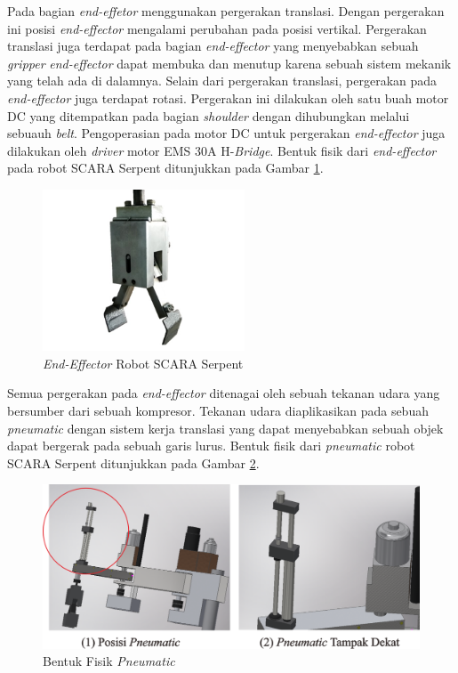 Pada bagian \textit{end-effetor} menggunakan pergerakan translasi. Dengan pergerakan ini posisi \textit{end-effector} mengalami perubahan pada posisi vertikal. Pergerakan translasi juga terdapat pada bagian \textit{end-effector} yang menyebabkan sebuah \textit{gripper }\textit{ end-effector} dapat membuka dan menutup karena sebuah sistem mekanik yang telah ada di dalamnya. Selain dari pergerakan translasi, pergerakan pada \textit{end-effector} juga terdapat rotasi. Pergerakan ini dilakukan oleh satu buah motor DC yang ditempatkan pada bagian \textit{shoulder} dengan dihubungkan melalui sebuauh \textit{belt}. Pengoperasian pada motor DC untuk pergerakan \textit{end-effector} juga dilakukan oleh \textit{driver} motor EMS 30A H-\textit{Bridge}. Bentuk fisik dari \textit{end-effector} pada robot SCARA Serpent ditunjukkan pada Gambar \ref{pic.endeffectorfisik}.
\begin{figure}[H]
	\centering
	\includegraphics[width=6cm]{gambar/capitsementara.jpg}
	\caption{\textit{End-Effector} Robot SCARA Serpent}
	\label{pic.endeffectorfisik}
	
\end{figure}
Semua pergerakan pada \textit{end-effector} ditenagai oleh sebuah tekanan udara yang bersumber dari sebuah kompresor. Tekanan udara diaplikasikan pada sebuah \textit{pneumatic} dengan sistem kerja translasi yang dapat menyebabkan sebuah objek dapat bergerak pada sebuah garis lurus. Bentuk fisik dari \textit{pneumatic} robot SCARA Serpent ditunjukkan pada Gambar \ref{pic.pneumatic}.
\begin{figure}[H]
	\centering
	\includegraphics[width=12cm]{gambar/pneumatic.png}
	\caption{Bentuk Fisik \textit{Pneumatic}}
	\label{pic.pneumatic}
\end{figure}
